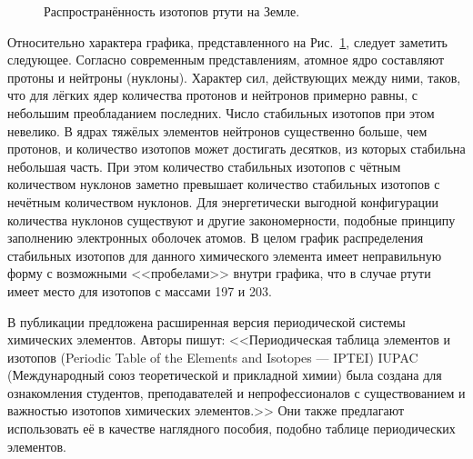 \documentclass[a5paper,openany]{book}
\begin{document}
\begin{figure}[ht] 
	\centering\small
	\caption{Распространённость изотопов ртути на Земле.}
	\label{f:HistHg}
\end{figure} 

Относительно характера графика, представленного на Рис.~\ref{f:HistHg}, следует заметить следующее. Согласно современным представлениям, атомное ядро составляют протоны и нейтроны (нуклоны). Характер сил, действующих между ними, таков, что для лёгких ядер количества протонов и нейтронов примерно равны, с небольшим преобладанием последних. Число стабильных изотопов при этом невелико.  В ядрах тяжёлых элементов нейтронов существенно больше, чем протонов, и количество изотопов может достигать десятков, из которых стабильна небольшая часть. При этом количество стабильных  изотопов с чётным количеством нуклонов заметно превышает количество стабильных  изотопов с нечётным количеством нуклонов. Для энергетически выгодной конфигурации количества нуклонов существуют и другие закономерности, подобные принципу заполнению электронных оболочек атомов. В целом график распределения стабильных изотопов для данного химического элемента имеет неправильную форму с возможными <<пробелами>> внутри графика, что в случае ртути имеет место для изотопов с массами 197 и 203.

В публикации \cite{IUPAC} предложена расширенная версия периодической  системы химических элементов.
Авторы пишут:   
<<Периодическая таблица элементов и изотопов (Periodic Table of the Elements and Isotopes --- IPTEI) IUPAC (Международный союз теоретической и прикладной химии) была создана для ознакомления студентов, преподавателей и непрофессионалов с существованием и важностью изотопов химических элементов.>> Они также предлагают использовать её в качестве наглядного пособия, подобно таблице периодических элементов.
\end{document}
